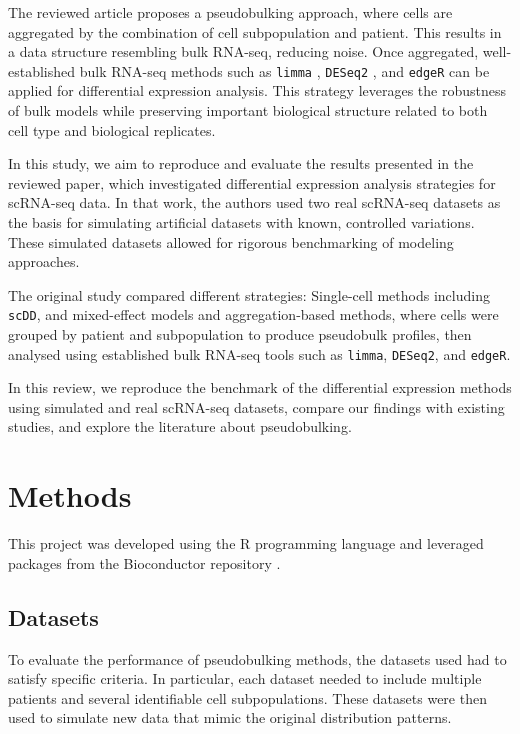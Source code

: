 \documentclass[a4paper, 11pt, twocolumn]{article}
\begin{document}
\begin{multicols}{2}
The reviewed article \citep{crowell2020muscat} proposes a pseudobulking approach, where cells are aggregated by the combination of cell subpopulation and patient. This results in a data structure resembling bulk RNA-seq, reducing noise. Once aggregated, well-established bulk RNA-seq methods such as \texttt{limma} \citep{limma}, \texttt{DESeq2} \citep{deseq2}, and \texttt{edgeR} \citep{edger} can be applied for differential expression analysis. This strategy leverages the robustness of bulk models while preserving important biological structure related to both cell type and biological replicates.


In this study, we aim to reproduce and evaluate the results presented in the reviewed paper, which investigated differential expression analysis strategies for scRNA-seq data. In that work, the authors used two real scRNA-seq datasets as the basis for simulating artificial datasets with known, controlled variations. These simulated datasets allowed for rigorous benchmarking of modeling approaches.

The original study compared different strategies: Single-cell methods including \texttt{scDD}, and mixed-effect models and aggregation-based methods, where cells were grouped by patient and subpopulation to produce pseudobulk profiles, then analysed using established bulk RNA-seq tools such as \texttt{limma}, \texttt{DESeq2}, and \texttt{edgeR}. 

In this review, we reproduce the benchmark of the differential expression methods using simulated and real scRNA-seq datasets, compare our findings with existing studies, and explore the literature about pseudobulking.

\section{Methods}

This project was developed using the R programming language \citep{base} and leveraged packages from the Bioconductor repository \citep{bioc}.

\subsection{Datasets}

To evaluate the performance of pseudobulking methods, the datasets used had to satisfy specific criteria. In particular, each dataset needed to include multiple patients and several identifiable cell subpopulations. These datasets were then used to simulate new data that mimic the original distribution patterns.


\end{multicols}
\end{document}
